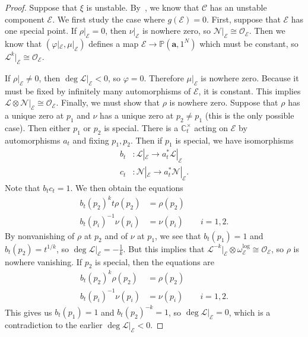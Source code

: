 \documentclass{amsart}
\theoremstyle{definition}
\theoremstyle{remark}
\theoremstyle{plain}
\theoremstyle{definition}
\theoremstyle{remark}
\newcommand{\C}{\mathbb{C}}
\renewcommand{\P}{\mathbb{P}}
\newcommand{\ba}{\mathbf{a}}
\newcommand{\mc}[1]{\mathcal{#1}}
\newcommand{\1}{\mathbf{1}}
\newcommand{\2}{\mathbf{2}}
\newcommand{\3}{\mathbf{3}}
\begin{document}
\begin{proof}
  Suppose that $\xi$ is unstable. By~, we know that $\mc{C}$ has an unstable component $\mc{E}$. We first study the case where $g(\mc{E}) = 0$. First, suppose that $\mc{E}$ has one special point. If $\rho|_{\mc{E}} = 0$, then $\nu|_{\mc{E}}$ is nowhere zero, so $\mc{N}|_{\mc{E}} \cong \mc{O}_{\mc{E}}$. Then we know that $(\varphi|_{\mc{E}}, \mu|_{\mc{E}})$ defines a map $\mc{E} \to \P(\ba, 1^N)$ which must be constant, so $\mc{L}^k |_{\mc{E}} \cong \mc{O}_{\mc{E}}$.

  If $\rho |_{\mc{E}} \neq 0$, then $\deg \mc{L}|_{\mc{E}} < 0$, so $\varphi = 0$. Therefore $\mu|_{\mc{E}}$ is nowhere zero. Because it must be fixed by infinitely many automorphisms of $\mc{E}$, it is constant. This implies $\mc{L} \otimes \mc{N} |_{\mc{E}} \cong \mc{O}_{\mc{E}}$. Finally, we must show that $\rho$ is nowhere zero. Suppose that $\rho$ has a unique zero at $p_1$ and $\nu$ has a unique zero at $p_2 \neq p_1$ (this is the only possible case). Then either $p_1$ or $p_2$ is special. There is a $\C^{\times}_t$ acting on $\mc{E}$ by automorphisms $a_t$ and fixing $p_1, p_2$. Then if $p_1$ is special, we have isomorphisms
  \begin{align*}
    b_t &\colon \mc{L}|_{\mc{E}} \to a_t^* \mc{L}|_{\mc{E}} \\
    c_t &\colon \mc{N}|_{\mc{E}} \to a_t^* \mc{N}|_{\mc{E}}.
  \end{align*}
  Note that $b_t c_t = 1$. We then obtain the equations
  \begin{align*}
    b_t(p_2)^k t \rho(p_2) &= \rho(p_2) \\
    b_t(p_i)^{-1} \nu(p_i) &= \nu(p_i) \qquad i = 1,2.
  \end{align*}
  By nonvanishing of $\rho$ at $p_2$ and of $\nu$ at $p_1$, we see that $b_t(p_1) = 1$ and $b_t(p_2) = t^{1/k}$, so $\deg \mc{L}|_{\mc{E}} = -\frac{1}{k}$. But this implies that $\mc{L}^{-k}|_{\mc{E}} \otimes \omega_{\mc{E}}^{\log} \cong \mc{O}_{\mc{E}}$, so $\rho$ is nowhere vanishing. If $p_2$ is special, then the equations are
  \begin{align*}
    b_t(p_2)^k \rho(p_2) &= \rho(p_2) \\
    b_t(p_i)^{-1} \nu(p_i) &= \nu(p_i) \qquad i = 1,2.
  \end{align*}
  This gives us $b_t(p_1) = 1$ and $b_t(p_2)^{-k} = 1$, so $\deg \mc{L}|_{\mc{E}} = 0$, which is a contradiction to the earlier $\deg \mc{L}|_{\mc{E}} < 0$.


\end{proof}
\end{document}
